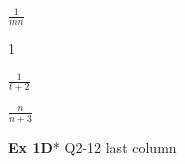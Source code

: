 \documentclass[11pt,a4paper,twoside]{article}
\begin{document}
\begin{answers}
\begin{inparaenum}[\bfseries 1.]
  \item   \begin{inparaenum}
          \item   $\frac{1}{mn}$
          \item   1
          \item   $\frac{1}{t + 2}$
          \end{inparaenum}
  \item   \begin{inparaenum} \item $\frac{n}{n + 3}$ \end{inparaenum}
  \end{inparaenum} 
  \end{answers}

\vfill
\begin{further}
  \textbf{Ex 1D}* Q2-12 last column
\end{further} 
\end{document}

